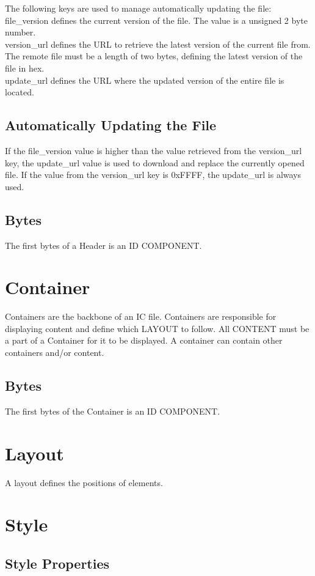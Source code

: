 \documentclass{report}
\begin{document}
The following keys are used to manage automatically updating the file:\\
file\_version defines the current version of the file. The value is a unsigned 2 byte number.\\
version\_url defines the URL to retrieve the latest version of the current file from. The remote file must be a length of two bytes, defining the latest version of the file in hex.\\
update\_url defines the URL where the updated version of the entire file is located.


\subsection{Automatically Updating the File}
If the file\_version value is higher than the value retrieved from the version\_url key, the update\_url value is used to download and replace the currently opened file. If the value from the version\_url key is 0xFFFF, the update\_url is always used.

\subsection{Bytes}
The first bytes of a Header is an ID COMPONENT. 

\section{Container}
Containers are the backbone of an IC file. Containers are responsible for displaying content and define which LAYOUT to follow. All CONTENT must be a part of a Container for it to be displayed. A container can contain other containers and/or content.\\

\subsection{Bytes}
The first bytes of the Container is an ID COMPONENT.

\section{Layout}
A layout defines the positions of elements. 
\section{Style}
\subsection{Style Properties}
\end{document}
